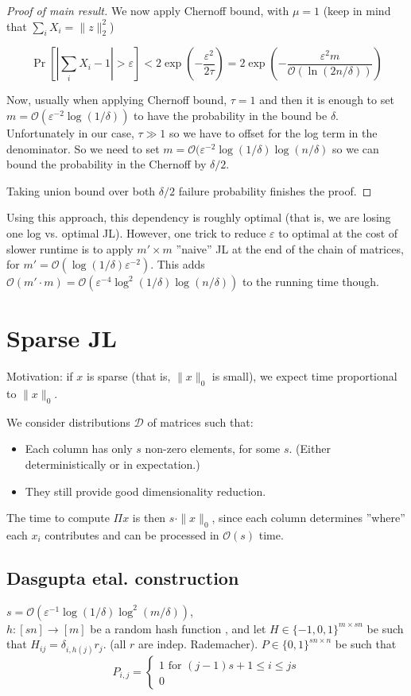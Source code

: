 \documentclass[11pt]{article}
\newcommand{\eps}{\varepsilon}
\newcommand{\bigo}{\mathcal{O}}
\begin{document}
\begin{proof}[Proof of main result]
We now apply Chernoff bound, with $\mu = 1$ (keep in mind that $\sum_i X_i = \|z\|_2^2$)

$$\Pr[ | \sum_i X_i - 1| > \eps  ] < 2 \exp(- \frac{\eps^2 }{2 \tau} ) = 2 \exp\left(- \frac{\eps^2 m}{\bigo(\ln(2n/\delta)) }\right)$$


Now, usually when applying Chernoff bound, $\tau=1$ and then it is enough to set $m = \bigo(\varepsilon^{-2} \log (1/\delta))$ to have the probability in the bound be $\delta$. Unfortunately in our case, $\tau \gg 1$ so we have to offset for the log term in the denominator. So we need to set 
$m = \bigo(\varepsilon^{-2} \log (1/\delta) \log(n/\delta)$ so we can bound the probability in the Chernoff by $\delta/2$.

Taking union bound over both $\delta/2$ failure probability finishes the proof.
\end{proof}

Using this approach, this dependency is roughly optimal (that is, we are losing one log vs. optimal JL). However, one trick to reduce $\eps$ to optimal at the cost of slower runtime is to apply $m' \times m$ ''naive'' JL at the end of the chain of matrices, for $m' = \bigo(\log (1/\delta) \eps^{-2})$. This adds $\bigo(m' \cdot m) = \bigo(\eps^{-4} \log^2 (1/\delta) \log (n/\delta))$ to the running time though.

\section{Sparse JL \cite{DBLP:conf/stoc/DasguptaKS10}}

Motivation: if $x$ is sparse (that is, $\|x\|_0$ is small), we expect time proportional to $\|x\|_0$. 

We consider distributions $\mathcal{D}$ of matrices such that:
\begin{itemize}
\item Each column has only $s$ non-zero elements, for some $s$. (Either deterministically or in expectation.)
\item They still provide good dimensionality reduction.
\end{itemize}

The time to compute $\Pi x$ is then $s \cdot \|x\|_0$, since each column determines ''where'' each $x_i$ contributes and can be processed in $\bigo(s)$ time.

\subsection{Dasgupta etal. construction}
$s = \bigo(\eps^{-1} \log (1/\delta) \log^2 (m/\delta))$,\\ $h : [sn] \to [m]$ be a random hash function , and let
$H \in \{-1,0,1\}^{m \times sn}$ be such that $H_{ij} = \delta_{i,h(j)} r_j$. (all $r$ are indep. Rademacher).
$P \in \{0,1\}^{sn \times n}$ be such that
$$P_{i,j} = \begin{cases}1 \text{ for } (j-1)s + 1 \le i \le js\\0 \end{cases}$$
\end{document}
